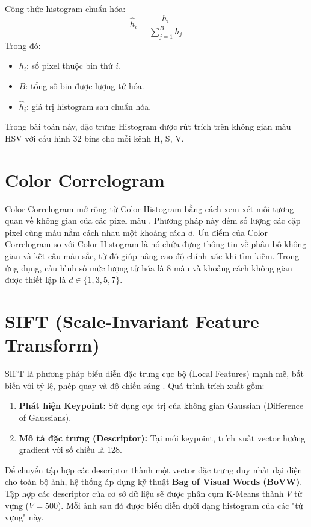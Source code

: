 Công thức histogram chuẩn hóa:
\begin{equation}
\hat{h}_i = \frac{h_i}{\sum_{j=1}^{B} h_j}
\end{equation}
Trong đó:
\begin{itemize}
    \item $h_i$: số pixel thuộc bin thứ $i$.
    \item $B$: tổng số bin được lượng tử hóa.
    \item $\hat{h}_i$: giá trị histogram sau chuẩn hóa.
\end{itemize}
Trong bài toán này, đặc trưng Histogram được rút trích trên không gian màu HSV với cấu hình 32 bins cho mỗi kênh H, S, V.

\section{Color Correlogram}
Color Correlogram mở rộng từ Color Histogram bằng cách xem xét mối tương quan về không gian của các pixel màu \cite{huang1997image}. Phương pháp này đếm số lượng các cặp pixel cùng màu nằm cách nhau một khoảng cách $d$.
Ưu điểm của Color Correlogram so với Color Histogram là nó chứa đựng thông tin về phân bố không gian và kết cấu màu sắc, từ đó giúp nâng cao độ chính xác khi tìm kiếm.
Trong ứng dụng, cấu hình số mức lượng tử hóa là 8 màu và khoảng cách không gian được thiết lập là $d \in \{1, 3, 5, 7\}$.

\section{SIFT (Scale-Invariant Feature Transform)}
SIFT là phương pháp biểu diễn đặc trưng cục bộ (Local Features) mạnh mẽ, bất biến với tỷ lệ, phép quay và độ chiếu sáng \cite{lowe2004distinctive}. Quá trình trích xuất gồm:
\begin{enumerate}
    \item \textbf{Phát hiện Keypoint:} Sử dụng cực trị của không gian Gaussian (Difference of Gaussians).
    \item \textbf{Mô tả đặc trưng (Descriptor):} Tại mỗi keypoint, trích xuất vector hướng gradient với số chiều là 128.
\end{enumerate}
Để chuyển tập hợp các descriptor thành một vector đặc trưng duy nhất đại diện cho toàn bộ ảnh, hệ thống áp dụng kỹ thuật \textbf{Bag of Visual Words (BoVW)}. Tập hợp các descriptor của cơ sở dữ liệu sẽ được phân cụm K-Means thành $V$ từ vựng ($V=500$). Mỗi ảnh sau đó được biểu diễn dưới dạng histogram của các "từ vựng" này.

